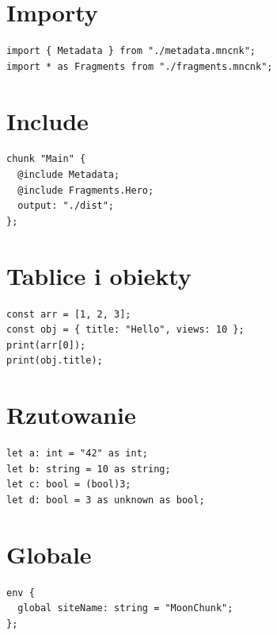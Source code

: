 \section{Importy}
\begin{lstlisting}[style=moonchunk]
import { Metadata } from "./metadata.mncnk";
import * as Fragments from "./fragments.mncnk";
\end{lstlisting}

\section{Include}
\begin{lstlisting}[style=moonchunk]
chunk "Main" {
  @include Metadata;
  @include Fragments.Hero;
  output: "./dist";
};
\end{lstlisting}

\section{Tablice i obiekty}
\begin{lstlisting}[style=moonchunk]
const arr = [1, 2, 3];
const obj = { title: "Hello", views: 10 };
print(arr[0]);
print(obj.title);
\end{lstlisting}

\section{Rzutowanie}
\begin{lstlisting}[style=moonchunk]
let a: int = "42" as int;
let b: string = 10 as string;
let c: bool = (bool)3;
let d: bool = 3 as unknown as bool;
\end{lstlisting}

\section{Globale}
\begin{lstlisting}[style=moonchunk]
env {
  global siteName: string = "MoonChunk";
};
\end{lstlisting}

